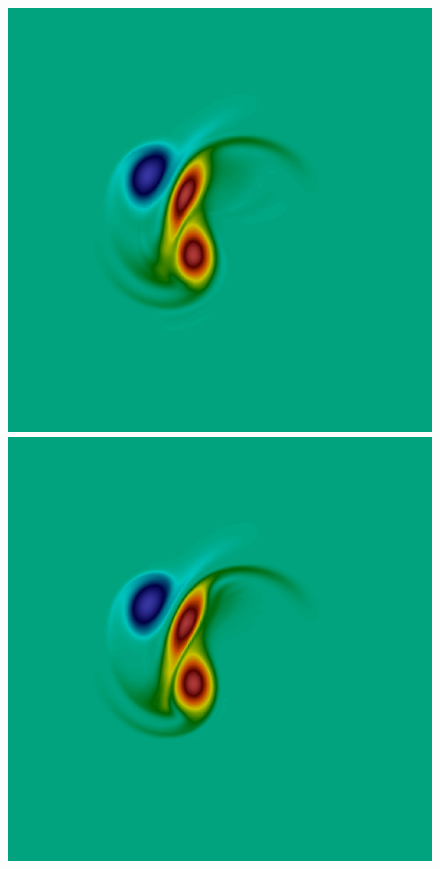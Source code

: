 \begin{figure}[h!]
\includegraphics[scale=0.06]{data/Incompressible_Euler/Snapshots/red_17_3.png}\hspace{1em}
\includegraphics[scale=0.06]{data/Incompressible_Euler/Snapshots/red_35_3.png}\hspace{1em}

\end{figure}
